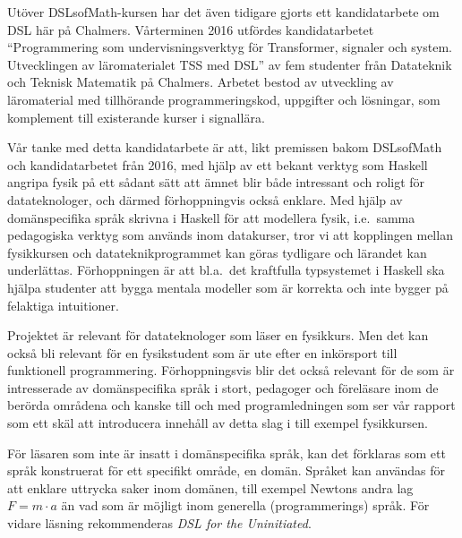 Utöver DSLsofMath-kursen har det även tidigare gjorts ett kandidatarbete om DSL 
här på Chalmers. Vårterminen 2016 utfördes kandidatarbetet
``Programmering som undervisningsverktyg för Transformer, signaler och
system. Utvecklingen av läromaterialet TSS med DSL'' av fem studenter
från Datateknik och Teknisk Matematik på Chalmers. Arbetet bestod av
utveckling av läromaterial med tillhörande programmeringskod,
uppgifter och lösningar, som komplement till existerande kurser i
signallära.\cite{kandidat2016}

Vår tanke med detta kandidatarbete är att, likt premissen bakom DSLsofMath
och kandidatarbetet från 2016, med hjälp av ett bekant verktyg
som Haskell angripa fysik på ett sådant sätt att ämnet blir både
intressant och roligt för datateknologer, och därmed förhoppningvis
också enklare. Med hjälp av domänspecifika språk skrivna i Haskell för att
modellera fysik, i.e.\ samma pedagogiska verktyg som används inom
datakurser, tror vi att kopplingen mellan fysikkursen och
datateknikprogrammet kan göras tydligare och lärandet kan underlättas.
Förhoppningen är att bl.a.\ det kraftfulla typsystemet i Haskell ska
hjälpa studenter att bygga mentala modeller som är korrekta och inte
bygger på felaktiga intuitioner.

Projektet är relevant för datateknologer som läser en fysikkurs. Men
det kan också bli relevant för en fysikstudent som är ute efter en
inkörsport till funktionell programmering. Förhoppningsvis blir det
också relevant för de som är intresserade av domänspecifika språk i
stort, pedagoger och föreläsare inom de berörda områdena och kanske
till och med programledningen som ser vår rapport som ett skäl att
introducera innehåll av detta slag i till exempel fysikkursen.

För läsaren som inte är insatt i domänspecifika språk, kan det
förklaras som ett språk konstruerat för ett specifikt område, en
domän. Språket kan användas för att enklare uttrycka saker inom
domänen, till exempel Newtons andra lag $F=m \cdot a$ än vad som är
möjligt inom generella (programmerings) språk. För vidare läsning
rekommenderas \textit{DSL for the Uninitiated}.\cite{DSLU}


